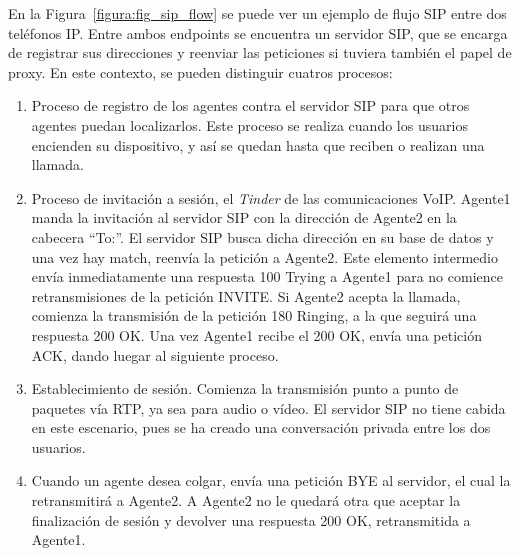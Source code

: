 \documentclass[a4paper, 12pt]{book}
\begin{document}
En la Figura~\ref{figura:fig_sip_flow} se puede ver un ejemplo de flujo SIP entre dos teléfonos IP. Entre ambos endpoints se encuentra un servidor SIP, que se encarga de registrar sus direcciones y reenviar las peticiones si tuviera también el papel de proxy. En este contexto, se pueden distinguir cuatros procesos:
\begin{enumerate}
  \item Proceso de registro de los agentes contra el servidor SIP para que otros agentes puedan localizarlos. Este proceso se realiza cuando los usuarios encienden su dispositivo, y así se quedan hasta que reciben o realizan una llamada.
  \item Proceso de invitación a sesión, el \emph{Tinder} de las comunicaciones VoIP. Agente1 manda la invitación al servidor SIP con la dirección de Agente2 en la cabecera ``To:''. El servidor SIP busca dicha dirección en su base de datos y una vez hay match, reenvía la petición a Agente2. Este elemento intermedio envía inmediatamente una respuesta 100 Trying a Agente1 para no comience retransmisiones de la petición INVITE. Si Agente2 acepta la llamada, comienza la transmisión de la petición 180 Ringing, a la que seguirá una respuesta 200 OK. Una vez Agente1 recibe el 200 OK, envía una petición ACK, dando luegar al siguiente proceso.
  \item Establecimiento de sesión. Comienza la transmisión punto a punto de paquetes vía RTP, ya sea para audio o vídeo. El servidor SIP no tiene cabida en este escenario, pues se ha creado una conversación privada entre los dos usuarios.
  \item Cuando un agente desea colgar, envía una petición BYE al servidor, el cual la retransmitirá a Agente2. A Agente2 no le quedará otra que aceptar la finalización de sesión y devolver una respuesta 200 OK, retransmitida a Agente1.
\end{enumerate}
\end{document}

